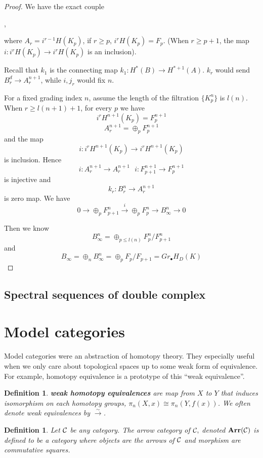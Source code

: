 \documentclass[11pt]{article}
\newtheorem{dfn}[thm]{Definition}
\newcommand{\calc}{{\cal C}}
\newcommand{\lrta}{\longrightarrow}
\begin{document}
\begin{proof}
We have the exact couple
\begin{center}
,
\end{center}
where $A_r=i^{r-1}H(K_p)$, if $r\geq p$, $i^rH(K_p)=F_p$. (When $r\geq p+1$, the map $i:i^rH(K_p)\lrta i^rH(K_p)$ is an inclusion).

Recall that $k_1$ is the connecting map $k_1:H^{*}(B)\lrta H^{*+1}(A)$. $k_r$ would send $B_r^d\lrta A_r^{n+1}$, while $i,j_r$ would fix $n$.

For a fixed grading index $n$, assume the length of the filtration $\{K_p^n\}$ is $l(n)$. When $r\geq l(n+1)+1$, for every $p$ we have
$$
i^rH^{n+1}(K_p)=F_p^{n+1}
$$
$$
A_r^{n+1}=\oplus_p F_p^{n+1}
$$
and the map
$$
i: i^rH^{n+1}(K_p)\lrta i^rH^{n+1}(K_p)
$$
is inclusion. Hence 
$$
i:A_r^{n+1}\lrta A_r^{n+1}\ \ \ i:F_{p+1}^{n+1}\lrta F_{p}^{n+1}
$$
is injective and 
$$
k_r:B_r^{n}\lrta A_r^{n+1}
$$
is zero map. We have
$$
0\lrta \oplus_p F_{p+1}^{n}\overset{i}{\lrta} \oplus_p F_{p}^{n}\lrta B_\infty^n\lrta 0 
$$

Then we know
$$
B_\infty^n=\oplus_{p\leq l(n)}F^{n}_p/F^n_{p+1}
$$
and 
$$
B_\infty=\oplus_n B_\infty^n=\oplus_p F_p/F_{p+1}=Gr_\bullet H_D(K)
$$

\end{proof}
\subsection{Spectral sequences of double complex}

\section{Model categories}
Model categories were an abstraction of homotopy theory. They especially useful when we only care about topological spaces up to some weak form of equivalence. For example, homotopy equivalence is a prototype of this ``weak equivalence''.
\begin{dfn}
\textbf{weak homotopy equivalences} are map from $X$ to $Y$ that induces isomorphism on each homotopy groups, $\pi_n(X,x)\cong \pi_n(Y,f(x))$. We often denote weak equivalences by $\overset{\sim}{\lrta}$.
\end{dfn}

\begin{dfn}
Let $\calc$ be any category. The arrow category of $\calc,$ denoted $\mathbf{Arr}(\calc)$ is defined to be a category where objects are the arrows of $\calc$ and morphism are commutative squares.
\end{dfn}
\end{document}

